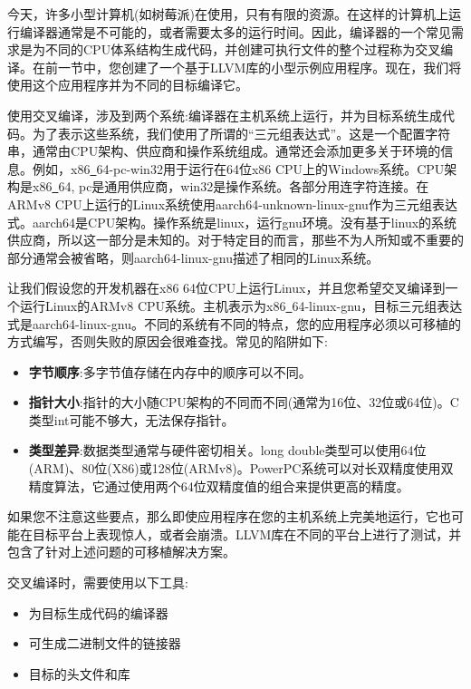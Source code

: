 
今天，许多小型计算机(如树莓派)在使用，只有有限的资源。在这样的计算机上运行编译器通常是不可能的，或者需要太多的运行时间。因此，编译器的一个常见需求是为不同的CPU体系结构生成代码，并创建可执行文件的整个过程称为交叉编译。在前一节中，您创建了一个基于LLVM库的小型示例应用程序。现在，我们将使用这个应用程序并为不同的目标编译它。\par

使用交叉编译，涉及到两个系统:编译器在主机系统上运行，并为目标系统生成代码。为了表示这些系统，我们使用了所谓的“三元组表达式”。这是一个配置字符串，通常由CPU架构、供应商和操作系统组成。通常还会添加更多关于环境的信息。例如，x86\underline{~}64-pc-win32用于运行在64位x86 CPU上的Windows系统。CPU架构是x86\underline{~}64, pc是通用供应商，win32是操作系统。各部分用连字符连接。在ARMv8 CPU上运行的Linux系统使用aarch64-unknown-linux-gnu作为三元组表达式。aarch64是CPU架构。操作系统是linux，运行gnu环境。没有基于linux的系统供应商，所以这一部分是未知的。对于特定目的而言，那些不为人所知或不重要的部分通常会被省略，则aarch64-linux-gnu描述了相同的Linux系统。\par

让我们假设您的开发机器在x86 64位CPU上运行Linux，并且您希望交叉编译到一个运行Linux的ARMv8 CPU系统。主机表示为x86\underline{~}64-linux-gnu，目标三元组表达式是aarch64-linux-gnu。不同的系统有不同的特点，您的应用程序必须以可移植的方式编写，否则失败的原因会很难查找。常见的陷阱如下:\par

\begin{itemize}
	\item \textbf{字节顺序}:多字节值存储在内存中的顺序可以不同。
	\item \textbf{指针大小}:指针的大小随CPU架构的不同而不同(通常为16位、32位或64位)。C类型int可能不够大，无法保存指针。
	\item \textbf{类型差异}:数据类型通常与硬件密切相关。long double类型可以使用64位(ARM)、80位(X86)或128位(ARMv8)。PowerPC系统可以对长双精度使用双精度算法，它通过使用两个64位双精度值的组合来提供更高的精度。
\end{itemize}

如果您不注意这些要点，那么即使应用程序在您的主机系统上完美地运行，它也可能在目标平台上表现惊人，或者会崩溃。LLVM库在不同的平台上进行了测试，并包含了针对上述问题的可移植解决方案。\par

交叉编译时，需要使用以下工具:\par

\begin{itemize}
	\item 为目标生成代码的编译器
	\item 可生成二进制文件的链接器
	\item 目标的头文件和库
\end{itemize}

